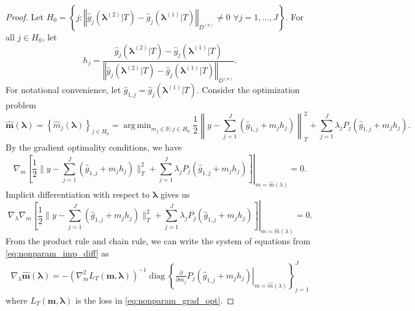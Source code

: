 \documentclass[10pt]{book}
\theoremstyle{definition}
\DeclareMathOperator*{\argmin}{arg\,min}
\DeclareMathOperator{\diag}{diag}
\begin{document}
\begin{proof}
	Let $H_{0} = \left \{
	j:\left\Vert \hat{g}_{j}(\boldsymbol{\lambda}^{(2)}|T)-\hat{g}_{j}(\boldsymbol{\lambda}^{(1)}|T)\right\Vert _{D^{(n)}} \ne 0\,\, \forall j = 1,...,J
	\right \}$.
	For all $j \in H_0$, let 
	\[
	h_{j}=
	\frac{\hat{g}_{j}(\boldsymbol{\lambda}^{(2)}|T)-\hat{g}_{j}(\boldsymbol{\lambda}^{(1)}|T)}{\left\Vert \hat{g}_{j}(\boldsymbol{\lambda}^{(2)}|T)-\hat{g}_{j}(\boldsymbol{\lambda}^{(1)}|T)\right\Vert _{D^{(n)}}}.
	\]
	For notational convenience, let $\hat{g}_{1,j} = \hat{g}_{j}(\boldsymbol{\lambda}^{(1)}|T)$. Consider the optimization problem
	\begin{equation}
	\hat{\boldsymbol{m}}(\boldsymbol{\lambda})=\left\{ \hat{m}_{j}(\boldsymbol{\lambda})\right\} _{j\in H_0}
	=\argmin_{m_{j} \in \mathbb{R}: j\in H_0}
	\frac{1}{2}
	\left \|y-\sum_{j=1}^{J}\left(\hat{g}_{1,j}+m_{j}h_{j}\right) \right \|_{T}^{2}
	+\sum_{j=1}^{J}\lambda_{j}
	P_{j} \left (\hat{g}_{1,j}+m_{j}h_{j} \right ).
	\end{equation}
	By the gradient optimality conditions, we have
	\begin{equation}
	\nabla_{m} \left .
	\left[\frac{1}{2}\|y-\sum_{j=1}^{J}\left(\hat{g}_{1,j}+m_{j}h_{j}\right)\|_{T}^{2}+\sum_{j=1}^{J}\lambda_{j}P_{j}(\hat{g}_{1,j}+m_{j}h_{j})\right] \right |_{m=\hat{m}(\lambda)}
	= 0.
	\label{eq:nonparam_grad_opt}
	\end{equation}
	Implicit differentiation with respect to $\boldsymbol{\lambda}$ gives us
	\begin{equation}
	\nabla_\lambda 
	\nabla_m
	\left . \left[
	\frac{1}{2}\|y-\sum_{j=1}^{J}\left(\hat{g}_{1,j}+m_{j}h_{j}\right)\|_{T}^{2}+\sum_{j=1}^{J}\lambda_{j}P_{j}(\hat{g}_{1,j}+m_{j}h_{j})\right] \right |_{m=\hat{m}(\lambda)}
	= 0.
	\label{eq:nonparam_imp_diff}
	\end{equation}
	From the product rule and chain rule, we can write the system of equations from \eqref{eq:nonparam_imp_diff} as
	\begin{align}
	\nabla_{\lambda} \hat{\boldsymbol{m}}(\boldsymbol{\lambda}) = - \left(
	\nabla_{m}^2 L_T(\boldsymbol{m}, \boldsymbol{\lambda})
	\right )^{-1}
	\diag \left \{ \left.
	\frac{\partial}{\partial m_{j}}P_{j}(\hat{g}_{1,j}+m_{j}h_{j})\right|_{m=\hat{m}(\lambda)}
	\right \}_{j=1}^J
	\label{eq:nonparam_grad}
	\end{align}
	where $L_T(\boldsymbol{m}, \boldsymbol{\lambda})$ is the loss in \eqref{eq:nonparam_grad_opt}.


\end{proof}
\end{document}
